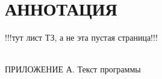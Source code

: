 

\newpage
\section*{АННОТАЦИЯ}


\newpage
!!!тут лист ТЗ, а не эта пустая страница!!!

\newpage
{}
\tableofcontents
\hspace{0pt}\\
ПРИЛОЖЕНИЕ А. Текст программы

